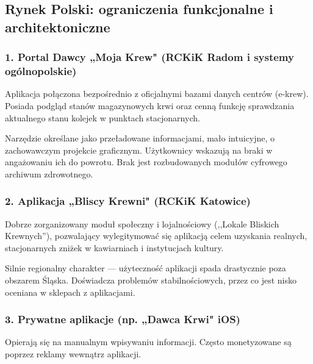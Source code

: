 \documentclass[11pt, a4paper]{article}
\begin{document}
\subsection{Rynek Polski: ograniczenia funkcjonalne i architektoniczne}

\subsubsection*{1. Portal Dawcy „Moja Krew" (RCKiK Radom i systemy ogólnopolskie)}
\begin{description}[leftmargin=2.8cm, style=sameline]
  \item[Mocne strony:] Aplikacja połączona bezpośrednio z oficjalnymi bazami danych centrów
    (e-krew). Posiada podgląd stanów magazynowych krwi oraz cenną funkcję sprawdzania
    aktualnego stanu kolejek w punktach stacjonarnych.
  \item[Słabe strony:] Narzędzie określane jako przeładowane informacjami, mało intuicyjne,
    o zachowawczym projekcie graficznym. Użytkownicy wskazują na braki w angażowaniu ich do
    powrotu. Brak jest rozbudowanych modułów cyfrowego archiwum zdrowotnego.
\end{description}

\subsubsection*{2. Aplikacja „Bliscy Krewni" (RCKiK Katowice)}
\begin{description}[leftmargin=2.8cm, style=sameline]
  \item[Mocne strony:] Dobrze zorganizowany moduł społeczny i lojalnościowy
    (,,Lokale Bliskich Krewnych''), pozwalający wylegitymować się aplikacją celem uzyskania
    realnych, stacjonarnych zniżek w kawiarniach i instytucjach kultury.
  \item[Słabe strony:] Silnie regionalny charakter — użyteczność aplikacji spada drastycznie
    poza obszarem Śląska. Doświadcza problemów stabilnościowych, przez co jest nisko
    oceniana w sklepach z aplikacjami.
\end{description}

\subsubsection*{3. Prywatne aplikacje (np. „Dawca Krwi" iOS)}
\begin{description}[leftmargin=2.8cm, style=sameline]
  \item[Słabe strony:] Opierają się na manualnym wpisywaniu informacji. Często monetyzowane
    są poprzez reklamy wewnątrz aplikacji.
\end{description}
\end{document}
